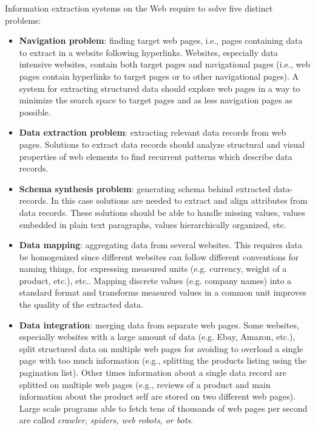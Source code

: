 Information extraction systems on the Web require to solve five distinct problems:
\begin{itemize}
\item \textbf{Navigation problem}: finding target web pages, i.e., pages containing data to extract in a website following hyperlinks. Websites, especially data intensive websites, contain both target pages and navigational pages (i.e., web pages contain hyperlinks to target pages or to other navigational pages). A system for extracting structured data should explore web pages in a way to minimize the search space to target pages and as less navigation pages as possible.  
\item \textbf{Data extraction problem}: extracting relevant data records from web pages. Solutions to extract data records should analyze structural and visual properties of web elements to find recurrent patterns which describe data records.
\item \textbf{Schema synthesis problem}: generating schema behind extracted data- records. In this case  solutions are needed to extract and align attributes from data records. These solutions should be able to handle missing values, values embedded in plain text paragraphs, values hierarchically organized, etc.  
\item  \textbf{Data mapping}: aggregating data from several websites. This requires data be homogenized since different websites can follow different conventions for naming things, for expressing measured units (e.g. currency, weight of a product, etc.), etc.. Mapping discrete values (e.g. company names) into a standard format and transforms measured values in a common unit improves the quality of the extracted data. 
\item \textbf{Data integration}: merging data from separate web pages. Some websites, especially websites with a large amount of data (e.g. Ebay, Amazon, etc.), split structured data on multiple web pages for avoiding to overload a single page with too much information (e.g., splitting the products listing using the pagination list). Other times information about a single data record are splitted on multiple web pages (e.g., reviews of a product and  main information about the product self are stored on two different 
web pages). 
Large scale programs able to fetch tens of thousands of web pages per second are called \textit{crawler, spiders, web robots, or bots}.
\end{itemize}

